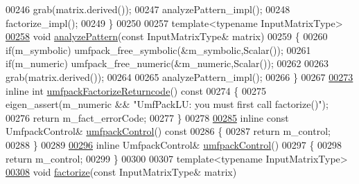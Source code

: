 \begin{DoxyCode}
00246       grab(matrix.derived());
00247       analyzePattern\_impl();
00248       factorize\_impl();
00249     \}
00250 
00257     \textcolor{keyword}{template}<\textcolor{keyword}{typename} InputMatrixType>
\hyperlink{class_eigen_1_1_umf_pack_l_u_ac7ea28b2017d6b26b7b08497f294e5e6}{00258}     \textcolor{keywordtype}{void} \hyperlink{class_eigen_1_1_umf_pack_l_u_ac7ea28b2017d6b26b7b08497f294e5e6}{analyzePattern}(\textcolor{keyword}{const} InputMatrixType& matrix)
00259     \{
00260       \textcolor{keywordflow}{if}(m\_symbolic) umfpack\_free\_symbolic(&m\_symbolic,Scalar());
00261       \textcolor{keywordflow}{if}(m\_numeric)  umfpack\_free\_numeric(&m\_numeric,Scalar());
00262 
00263       grab(matrix.derived());
00264 
00265       analyzePattern\_impl();
00266     \}
00267 
\hyperlink{class_eigen_1_1_umf_pack_l_u_a822fa9d82754269c379dc4ce17920b0a}{00273}     \textcolor{keyword}{inline} \textcolor{keywordtype}{int} \hyperlink{class_eigen_1_1_umf_pack_l_u_a822fa9d82754269c379dc4ce17920b0a}{umfpackFactorizeReturncode}()\textcolor{keyword}{ const}
00274 \textcolor{keyword}{    }\{
00275       eigen\_assert(m\_numeric && \textcolor{stringliteral}{"UmfPackLU: you must first call factorize()"});
00276       \textcolor{keywordflow}{return} m\_fact\_errorCode;
00277     \}
00278 
\hyperlink{class_eigen_1_1_umf_pack_l_u_ae83d178202f3d44c1789c1c93842bf2e}{00285}     \textcolor{keyword}{inline} \textcolor{keyword}{const} UmfpackControl& \hyperlink{class_eigen_1_1_umf_pack_l_u_ae83d178202f3d44c1789c1c93842bf2e}{umfpackControl}()\textcolor{keyword}{ const}
00286 \textcolor{keyword}{    }\{
00287       \textcolor{keywordflow}{return} m\_control;
00288     \}
00289 
\hyperlink{class_eigen_1_1_umf_pack_l_u_a679bd267a0407d4ca985d97f0b864101}{00296}     \textcolor{keyword}{inline} UmfpackControl& \hyperlink{class_eigen_1_1_umf_pack_l_u_a679bd267a0407d4ca985d97f0b864101}{umfpackControl}()
00297     \{
00298       \textcolor{keywordflow}{return} m\_control;
00299     \}
00300 
00307     \textcolor{keyword}{template}<\textcolor{keyword}{typename} InputMatrixType>
\hyperlink{class_eigen_1_1_umf_pack_l_u_a1471bf890503e743c45d75cc02a5345d}{00308}     \textcolor{keywordtype}{void} \hyperlink{class_eigen_1_1_umf_pack_l_u_a1471bf890503e743c45d75cc02a5345d}{factorize}(\textcolor{keyword}{const} InputMatrixType& matrix)

\end{DoxyCode}
